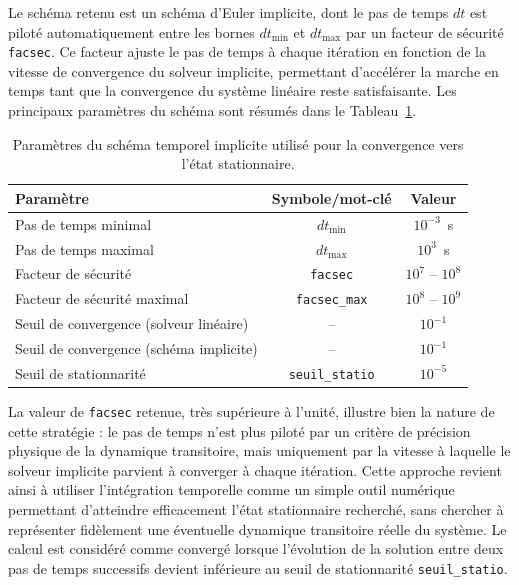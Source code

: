 Le schéma retenu est un schéma d'Euler implicite, dont le pas de temps $dt$ est piloté automatiquement entre les bornes $dt_{\mathrm{min}}$ et $dt_{\mathrm{max}}$ par un facteur de sécurité \texttt{facsec}. Ce facteur ajuste le pas de temps à chaque itération en fonction de la vitesse de convergence du solveur implicite, permettant d'accélérer la marche en temps tant que la convergence du système linéaire reste satisfaisante. Les principaux paramètres du schéma sont résumés dans le Tableau~\ref{tab:solveur}.

\begin{table}[H]
\centering
\begin{tabular}{lcc}
\toprule
Paramètre & Symbole/mot-clé & Valeur \\
\midrule
Pas de temps minimal & $dt_{\mathrm{min}}$ & $10^{-3}$~s \\
Pas de temps maximal & $dt_{\mathrm{max}}$ & $10^{3}$~s \\
Facteur de sécurité & \texttt{facsec} & $10^{7}$ -- $10^{8}$ \\
Facteur de sécurité maximal & \texttt{facsec\_max} & $10^{8}$ -- $10^{9}$ \\
Seuil de convergence (solveur linéaire) & -- & $10^{-1}$ \\
Seuil de convergence (schéma implicite) & -- & $10^{-1}$ \\
Seuil de stationnarité & \texttt{seuil\_statio} & $10^{-5}$ \\
\bottomrule
\end{tabular}
\caption{Paramètres du schéma temporel implicite utilisé pour la convergence vers l'état stationnaire.}
\label{tab:solveur}
\end{table}

La valeur de \texttt{facsec} retenue, très supérieure à l'unité, illustre bien la nature de cette stratégie : le pas de temps n'est plus piloté par un critère de précision physique de la dynamique transitoire, mais uniquement par la vitesse à laquelle le solveur implicite parvient à converger à chaque itération. Cette approche revient ainsi à utiliser l'intégration temporelle comme un simple outil numérique permettant d'atteindre efficacement l'état stationnaire recherché, sans chercher à représenter fidèlement une éventuelle dynamique transitoire réelle du système. Le calcul est considéré comme convergé lorsque l'évolution de la solution entre deux pas de temps successifs devient inférieure au seuil de stationnarité \texttt{seuil\_statio}.